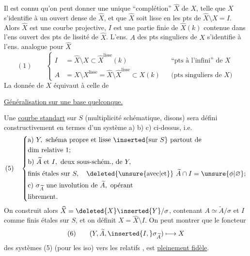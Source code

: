 Il est connu qu'on peut donner une unique ``complétion'' $\widehat X$ de $X$, telle que  $X$ s'identifie à un ouvert dense de $\widehat X$, et que $\widehat X$ soit lisse en les pts de $\widehat X\setminus X=I$. Alors $\widehat X$ est une courbe projective, $I$ est  une partie finie de $\widehat X(k)$ contenue dans l'ens ouvert des pts de lissité de $\widehat X$. L'ens. $A$ des pts singuliers de $X$ s'identifie à l'ens. analogue pour $\widehat X$
\[
(1)\qquad
\left\{\begin{aligned}
I&=\widehat X\setminus X\subset\widehat X^{\mathrm{lisse}}(k)
&&\text{``pts à l'infini'' de }X\\
A&=X\setminus X^{\mathrm{lisse}}=\widehat X\setminus\widehat X^{\mathrm{lisse}}\subset X(k)
&&\text{(pts singuliers de }X\text{)}
\end{aligned}\right.
\]
La donnée de $X$ équivaut à celle de

\uline{Généralisation sur une base quelconque.}

Une \uline{courbe standart} sur $S$ (multiplicité schématique, disons) sera défini constructivement en termes d'un système a) b) c)  ci-dessus, i.e.
\[
(5)\quad\left\{\begin{aligned}
&\text{a) }Y,\text{ schéma propre et lisse }\inserted{\text{sur }S}\text{ partout de}\\
&\text{dim relative }1;\\
&\text{b) }\widetilde A\text{ et }I,\text{ deux sous-schém., de }Y,\\
&\text{finis étales sur }S,\quad\deleted{\unsure{\text{avec}|\text{et}}}\ \widetilde A\cap I=\unsure{\phi|\varnothing};\\
&\text{c) }\sigma_{\widetilde A}\text{ une involution de }\widetilde A,\text{ opérant}\\
&\text{librement.}
\end{aligned}\right.
\]
On construit alors $\widehat X=\deleted{X}\inserted{Y}/\sigma$, contenant $A\simeq\widetilde A/\sigma$ et $I$ comme   finis étales sur $S$, et on définit $X=\widehat X\setminus I$. On peut montrer que le foncteur
\[
(6)\qquad(Y,\widetilde A,\inserted{I,}\sigma_{\widetilde A})\longmapsto X
\]
des systèmes (5) (pour les iso) vers les  relatifs , est \uline{pleinement fidèle}.


